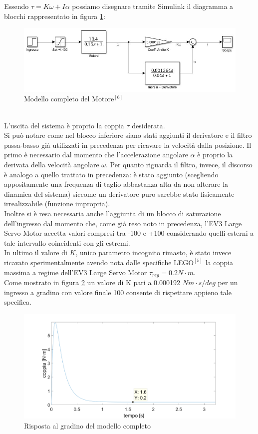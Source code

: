 Essendo $\tau=K\omega+I\alpha$ possiamo disegnare tramite Simulink il diagramma a blocchi rappresentato in figura \ref{modMotoreTorque}:
\begin{figure}[ht]
	\centering
	\includegraphics[width=\textwidth]{modMotoreTorque.jpg}
	\caption{Modello completo del Motore$^{[6]}$}
	\label{modMotoreTorque}
\end{figure}
\\L'uscita del sistema è proprio la coppia $\tau$ desiderata.\\
Si può notare come nel blocco inferiore siano stati aggiunti il derivatore e il filtro passa-basso già utilizzati in precedenza per ricavare la velocità dalla posizione. Il primo è necessario dal momento che l'accelerazione angolare $\alpha$ è proprio la derivata della velocità angolare $\omega$. Per quanto riguarda il filtro, invece,
il discorso è analogo a quello trattato in precedenza:
è stato aggiunto (scegliendo appositamente una frequenza di taglio abbastanza alta da non alterare la dinamica del sistema) siccome un derivatore puro sarebbe stato fisicamente irrealizzabile (funzione impropria).\\
Inoltre si è resa necessaria anche l'aggiunta di un blocco di saturazione dell'ingresso dal momento che, come già reso noto in precedenza, l'EV3 Large Servo Motor accetta valori compresi tra -100 e +100 considerando quelli esterni a tale intervallo coincidenti con gli estremi.\\
In ultimo il valore di $K$, unico parametro incognito rimasto, è stato invece ricavato sperimentalmente avendo nota dalle specifiche LEGO$^{[5]}$ la coppia massima a regime dell'EV3 Large Servo Motor $\tau_{reg}=0.2N\cdot m$.\\
Come mostrato in figura \ref{torque02} un valore di K pari a 0.000192 $Nm\cdot s/deg$ per un ingresso a gradino con valore finale 100 consente di rispettare appieno tale specifica.
\begin{figure}[ht]
	\centering
	\includegraphics[width=\textwidth]{torque192.png}
	\caption{Risposta al gradino del modello completo}
	\label{torque02}
\end{figure}